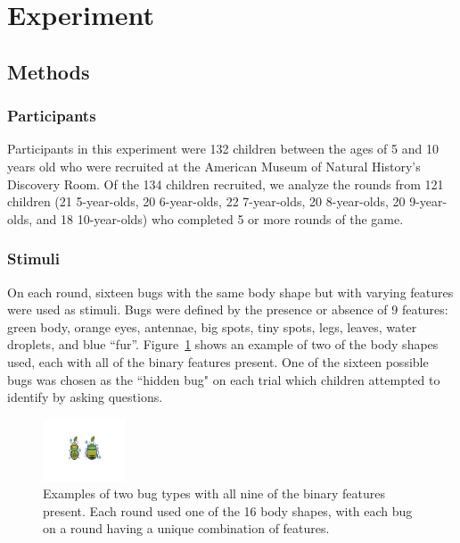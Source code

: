 \documentclass[10pt,letterpaper]{article}
\begin{document}
\section{Experiment}


\subsection{Methods}

\subsubsection{Participants}

Participants in this experiment were 132 children between the ages of 5 and 10 
years old who were recruited at the American Museum of Natural History's 
Discovery Room. Of the 134 children recruited, we analyze the rounds from 121 
children (21 5-year-olds, 20 6-year-olds, 22 7-year-olds, 20 8-year-olds, 20 9-year-olds, 
and 18 10-year-olds) who completed 5 or more rounds of the game.

\subsubsection{Stimuli}

On each round, sixteen bugs with the same body shape but with varying features were used as stimuli. Bugs were defined by the presence or absence of 9 features: green body, 
orange eyes, antennae, big spots, tiny spots, legs, leaves, water droplets, and blue 
``fur''. Figure~\ref{fig:example_bugs} shows an example of two of the body shapes used, each with all of the binary features present. One of the sixteen possible bugs was chosen as the ``hidden bug" on each trial which 
children attempted to identify by asking questions.


\begin{figure}[h]
  \centering
  \includegraphics[width=0.22\textwidth]{figures/example_bugs}
  \caption{Examples of two bug types with all nine of the binary features present. Each round used one of the 16 
body shapes, with each bug on a round having a unique combination of features.}
  \label{fig:example_bugs}
\end{figure} 
\end{document}
